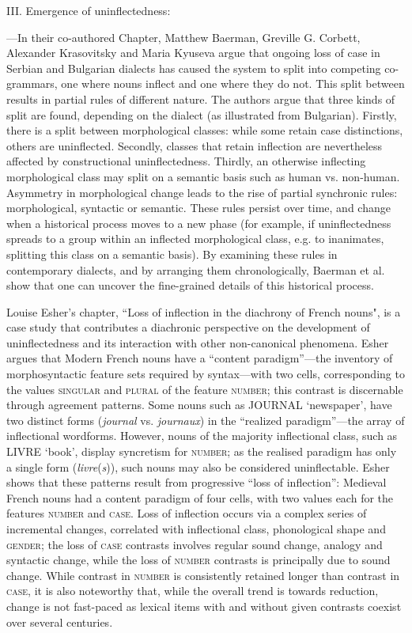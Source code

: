 \documentclass[output=paper]{langscibook}
\begin{document}
\medskip

\noindent III. Emergence of uninflectedness:

\medskip

---In their co-authored Chapter, Matthew Baerman, Greville G. Corbett, Alexander Krasovitsky and Maria Kyuseva argue that ongoing loss of case in Serbian and Bulgarian dialects has caused the system to split into competing co-grammars, one where nouns inflect and one where they do not. This split between results in partial rules of different nature. The authors argue that three kinds of split are found, depending on the dialect (as illustrated from Bulgarian). Firstly, there is a split between morphological classes: while some retain case distinctions, others are uninflected. Secondly, classes that retain inflection are nevertheless affected by constructional uninflectedness. Thirdly, an otherwise inflecting morphological class may split on a semantic basis such as human vs. non-human. Asymmetry in morphological change leads to the rise of partial synchronic rules: morphological, syntactic or semantic. These rules persist over time, and change when a historical process moves to a new phase (for example, if uninflectedness spreads to a group within an inflected morphological class, e.g. to inanimates, splitting this class on a semantic basis). By examining these rules in contemporary dialects, and by arranging them chronologically, Baerman et al. show that one can uncover the fine-grained details of this historical process.

Louise Esher's chapter, ``Loss of inflection in the diachrony of French nouns", is a case study that contributes a diachronic perspective on the development of uninflectedness and its interaction with other non-canonical phenomena. Esher argues that Modern French nouns have a ``content paradigm''---the inventory of morphosyntactic feature sets required by syntax---with two cells, corresponding to the values \textsc{singular} and \textsc{plural} of the feature \textsc{number}; this contrast is discernable through agreement patterns. Some nouns such as JOURNAL `newspaper', have two distinct forms (\emph{journal} vs. \emph{journaux}) in the ``realized paradigm''---the array of inflectional wordforms. However, nouns of the majority inflectional class, such as LIVRE `book', display syncretism for \textsc{number}; as the realised paradigm has only a single form (\emph{livre}(\emph{s})), such nouns may also be considered uninflectable. Esher shows that these patterns result from progressive ``loss of inflection'': Medieval French nouns had a content paradigm of four cells, with two values each for the features \textsc{number} and \textsc{case}. Loss of inflection occurs via a complex series of incremental changes, correlated with inflectional class, phonological shape and \textsc{gender}; the loss of \textsc{case} contrasts involves regular sound change, analogy and syntactic change, while the loss of \textsc{number} contrasts is principally due to sound change. While contrast in \textsc{number} is consistently retained longer than contrast in \textsc{case}, it is also noteworthy that, while the overall trend is towards reduction, change is not fast-paced as lexical items with and without given contrasts coexist over several centuries.
\end{document}
